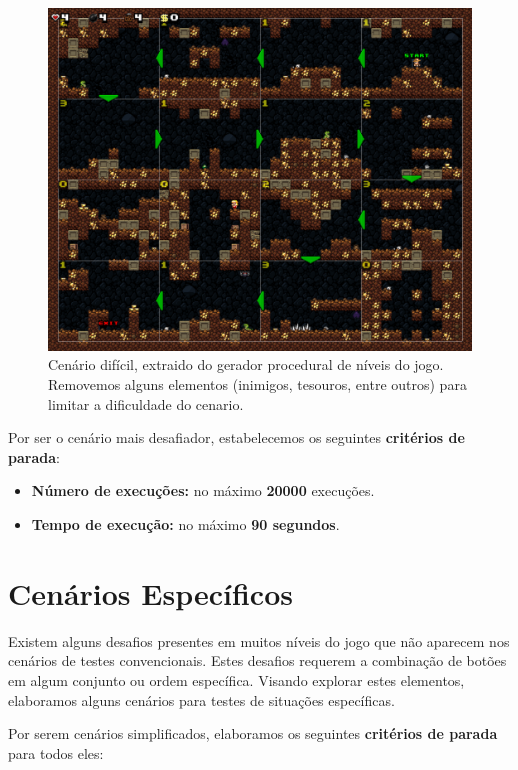 \begin{figure}[H]
\centering
\includegraphics[width=\textwidth / 2]{fig/levels/level3.pdf}
\caption{Cenário difícil, extraido do gerador procedural de níveis do jogo.
	Removemos alguns elementos (inimigos, tesouros, entre outros) para limitar a
	dificuldade do cenario.}
\label{fig:level3}
\end{figure}


Por ser o cenário mais desafiador, estabelecemos os seguintes \textbf{critérios
de parada}:

\begin{itemize}
	\item \textbf{Número de execuções:} no máximo \textbf{20000} execuções.
	\item \textbf{Tempo de execução:} no máximo \textbf{90 segundos}.
\end{itemize}


\section{\label{section:scenarios-specific}Cenários Específicos}

Existem alguns desafios presentes em muitos níveis do jogo que não aparecem nos
cenários de testes convencionais. Estes desafios requerem a combinação de botões
em algum conjunto ou ordem específica. Visando explorar estes elementos,
elaboramos alguns cenários para testes de situações específicas.

Por serem cenários simplificados, elaboramos os seguintes \textbf{critérios de
parada} para todos eles:


